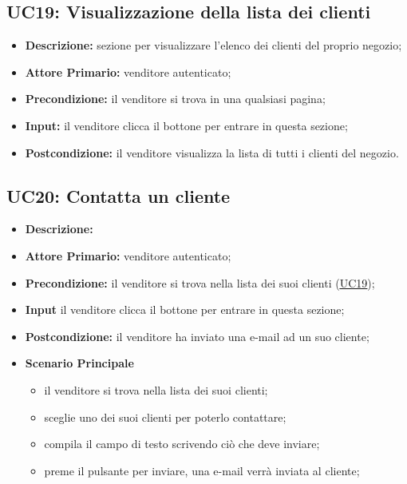         \subsection{UC19: Visualizzazione della lista dei clienti}
        \label{sec:UC19}
            \begin{itemize}
                \item \textbf{Descrizione:} sezione per visualizzare l'elenco dei clienti del proprio negozio;
                \item \textbf{Attore Primario:} venditore autenticato; 
                \item \textbf{Precondizione:} il venditore si trova in una qualsiasi pagina;
                \item \textbf{Input:} il venditore clicca il bottone per entrare in questa sezione; 
                \item \textbf{Postcondizione:} il venditore visualizza la lista di tutti i clienti del negozio.
                \end{itemize}


        \subsection{UC20: Contatta un cliente}
        \begin{itemize}
            \item \textbf{Descrizione:}
            \item \textbf{Attore Primario:} venditore autenticato;
            \item \textbf{Precondizione:} il venditore si trova nella lista dei suoi clienti (\hyperref[sec:UC19]{\underline{UC19}});
            \item \textbf{Input} il venditore clicca il bottone per entrare in questa sezione; 
            \item \textbf{Postcondizione:} il venditore ha inviato una e-mail ad un suo cliente;
            \item \textbf{Scenario Principale}
                \begin{itemize}
                    \item il venditore si trova nella lista dei suoi clienti;
                    \item sceglie uno dei suoi clienti per poterlo contattare;
                    \item compila il campo di testo scrivendo ciò che deve inviare;
                    \item preme il pulsante per inviare, una e-mail verrà inviata al cliente;
                \end{itemize}
        \end{itemize}


